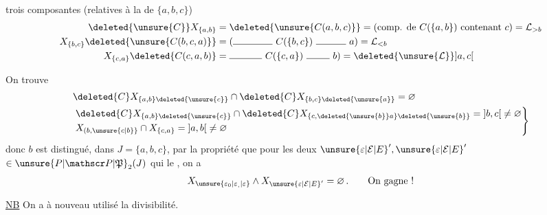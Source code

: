 trois composantes (relatives à la  de $\{a,b,c\}$)
\[
\begin{aligned}
\deleted{\unsure{C}}X_{\{a,b\}}&=\deleted{\unsure{C(a,b,c)}}=(\text{comp. de }C(\{a,b\})\text{ contenant }c)=\mathcal L_{>b}\\
X_{\{b,c\}}\deleted{\unsure{C(b,c,a)}}&=(\rule{1.45cm}{.4pt}\ C(\{b,c\})\ \rule{1.1cm}{.4pt}\ a)=\mathcal L_{<b}\\
X_{\{c,a\}}\deleted{C(c,a,b)}&=\rule{1.2cm}{.4pt}\ C(\{c,a\})\ \rule{.85cm}{.4pt}\ b)=\deleted{\unsure{\mathcal L}}\mathopen{]}a,c\mathclose{[}
\end{aligned}
\]

On trouve
\[
\begin{aligned}
&\deleted{C}X_{\{a,b\}\deleted{\unsure{c}}}\cap\deleted{C}X_{\{b,c\}\deleted{\unsure{a}}}=\varnothing\\
&\left.\begin{aligned}
&\deleted{C}X_{\{a,b\}\deleted{\unsure{c}}}\cap\deleted{C}X_{\{c,\deleted{\unsure{b}}a\}\deleted{\unsure{b}}}=\mathopen{]}b,c\mathclose{[}\ne\varnothing\\
&X_{(b,\unsure{c|b}\}}\cap X_{\{c,a\}}=\mathopen{]}a,b\mathclose{[}\ne\varnothing
\end{aligned}\right\}
\end{aligned}
\]
donc $b$ est distingué, dans $J=\{a,b,c\}$, par la propriété que pour les deux  ${\unsure{\varepsilon|\mathcal E|E}}',\unsure{\varepsilon|\mathcal E|E}'$  $\in\unsure{P|\mathscr P|\mathfrak P}_2(J)$ qui le , on a
\[
 X_{\unsure{\varepsilon_{0}|\varepsilon_{,}|\varepsilon}}\wedge X_{\unsure{\varepsilon|\mathcal E|E}'}=\varnothing\,.\qquad\text{On gagne !}
\]

\uline{NB} On a à nouveau utilisé la divisibilité.

